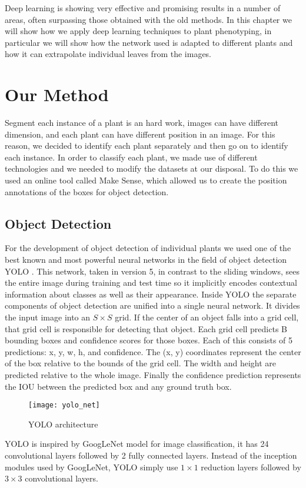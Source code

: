 



Deep learning is showing very effective and promising results in a number of areas, often surpassing those obtained with the old methods. In this chapter we will show
how we apply deep learning techniques to plant phenotyping, in particular we will show how the network used is adapted to different plants and how it can extrapolate
individual leaves from the images.

\section{Our Method}
Segment each instance of a plant is an hard work, images can have different dimension, and each plant can have different position in an image. For this reason, we decided
to identify each plant separately and then go on to identify each instance. In order to classify each plant, we made use of different technologies and we needed to modify
the datasets at our disposal. To do this we used an online tool called Make Sense, which allowed us to create the position annotations of the boxes for object detection.

\subsection{Object Detection}
For the development of object detection of individual plants we used one of the best known and most powerful neural networks in the field of object detection YOLO
\cite{redmon2016look}. This network, taken in version 5, in contrast to the sliding windows, sees the entire image during training and test time so it implicitly encodes
contextual information about classes as well as their appearance. Inside YOLO the separate components of object detection are unified into a single neural network.
It divides the input image into an $S \times S$ grid. If the center of an object falls into a grid cell, that grid cell is responsible for detecting that object.
Each grid cell predicts B bounding boxes and confidence scores for those boxes. Each of this consists of 5 predictions: x, y, w, h, and confidence. The (x, y)
coordinates represent the center of the box relative to the bounds of the grid cell. The width and height are predicted relative to the whole image. Finally
the confidence prediction represents the IOU between the predicted box and any ground truth box.
\begin{figure}[ht] 
    \centering
    \texttt{[image: yolo\_net]} 
    \caption{YOLO architecture}
\end{figure}
YOLO is inspired by GoogLeNet \cite{Szegedy_2015_CVPR} model for image classification, it has 24 convolutional layers followed by 2 fully connected layers.
Instead of the inception modules used by GoogLeNet, YOLO simply use $1 \times 1$ reduction layers followed by $3 \times 3$ convolutional layers.

